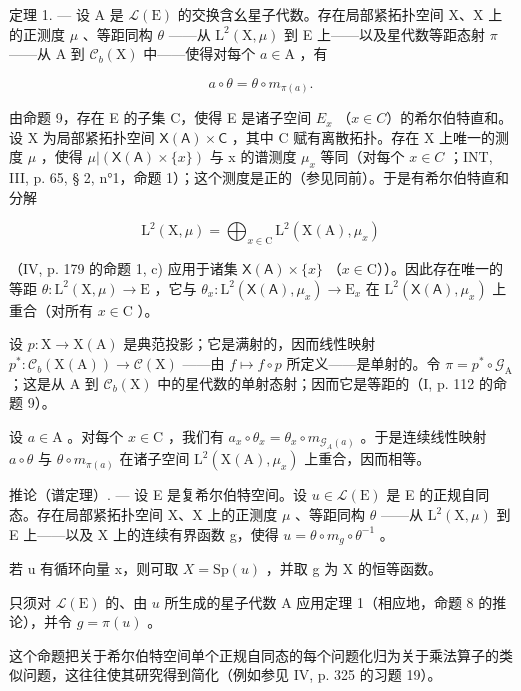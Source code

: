 定理 1. --- 设 A 是 \(\mathcal{L}(\mathrm{E})\) 的交换含幺星子代数。存在局部紧拓扑空间 X、X 上的正测度 \(\mu\) 、等距同构 \(\theta\) ——从 \(\mathrm{L}^2 (\mathrm{X},\mu)\) 到 E 上——以及星代数等距态射 \(\pi\) ——从 A 到 \(\mathcal{C}_b(\mathrm{X})\) 中——使得对每个 \(a\in \mathrm{A}\) ，有

\[
a \circ \theta = \theta \circ m _ {\pi (a)}.
\]

由命题 9，存在 E 的子集 C，使得 E 是诸子空间 \(E_{x}\) （\(x \in C\)）的希尔伯特直和。设 X 为局部紧拓扑空间 \(\mathsf{X}(\mathsf{A}) \times \mathsf{C}\) ，其中 C 赋有离散拓扑。存在 X 上唯一的测度 \(\mu\) ，使得 \(\mu|(\mathsf{X}(\mathsf{A}) \times \{x\})\) 与 x 的谱测度 \(\mu_{x}\) 等同（对每个 \(x \in C\) ；INT, III, p. 65, § 2, n°1，命题 1）；这个测度是正的（参见同前）。于是有希尔伯特直和分解

\[
\mathrm{L} ^ {2} (\mathrm{X}, \mu) = \bigoplus_ {x \in \mathrm{C}} \mathrm{L} ^ {2} (\mathrm{X} (\mathrm{A}), \mu_ {x})
\]

（IV, p. 179 的命题 1, c) 应用于诸集 \(\mathsf{X}(\mathsf{A}) \times \{x\}\) （\(x \in \mathrm{C}\)））。因此存在唯一的等距 \(\theta: \mathrm{L}^2(\mathrm{X}, \mu) \to \mathrm{E}\) ，它与 \(\theta_x: \mathrm{L}^2(\mathsf{X}(\mathsf{A}), \mu_x) \to \mathrm{E}_x\) 在 \(\mathrm{L}^2(\mathsf{X}(\mathsf{A}), \mu_x)\) 上重合（对所有 \(x \in \mathrm{C}\) ）。

设 \(p \colon \mathrm{X} \to \mathrm{X}(\mathrm{A})\) 是典范投影；它是满射的，因而线性映射 \(p^* \colon \mathcal{C}_b(\mathrm{X}(\mathrm{A})) \to \mathcal{C}(\mathrm{X})\) ——由 \(f \mapsto f \circ p\) 所定义——是单射的。令 \(\pi = p^* \circ \mathcal{G}_{\mathrm{A}}\) ；这是从 A 到 \(\mathcal{C}_b(\mathrm{X})\) 中的星代数的单射态射；因而它是等距的（I, p. 112 的命题 9）。

设 \(a \in \mathrm{A}\) 。对每个 \(x \in \mathrm{C}\) ，我们有 \(a_x \circ \theta_x = \theta_x \circ m_{\mathcal{G}_A(a)}\) 。于是连续线性映射 \(a \circ \theta\) 与 \(\theta \circ m_{\pi(a)}\) 在诸子空间 \(\mathrm{L}^2(\mathrm{X}(\mathrm{A}), \mu_x)\) 上重合，因而相等。

推论（谱定理）. --- 设 E 是复希尔伯特空间。设 \(u \in \mathcal{L}(\mathrm{E})\) 是 E 的正规自同态。存在局部紧拓扑空间 X、X 上的正测度 \(\mu\) 、等距同构 \(\theta\) ——从 \(\mathrm{L}^{2}(\mathrm{X},\mu)\) 到 E 上——以及 X 上的连续有界函数 g，使得 \(u = \theta \circ m_{g} \circ \theta^{-1}\) 。

若 u 有循环向量 x，则可取 \(X = \mathrm{Sp}(u)\) ，并取 g 为 X 的恒等函数。

只须对 \(\mathcal{L}(\mathrm{E})\) 的、由 \(u\) 所生成的星子代数 A 应用定理 1（相应地，命题 8 的推论），并令 \(g = \pi(u)\) 。

这个命题把关于希尔伯特空间单个正规自同态的每个问题化归为关于乘法算子的类似问题，这往往使其研究得到简化（例如参见 IV, p. 325 的习题 19）。

